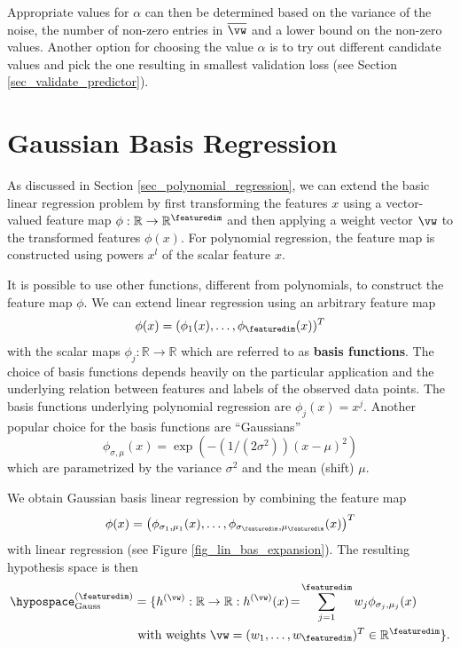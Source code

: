 \documentclass[12pt]{report}
\begin{document}
Appropriate values for $\alpha$ can then be determined based 
on the variance of the noise, the number of non-zero entries in 
$\overline{\vw}$ and a lower bound on the non-zero values. 
Another option for choosing the value $\alpha$ is to try out different 
candidate values and pick the one resulting in smallest validation 
loss (see Section \ref{sec_validate_predictor}). 


\section{Gaussian Basis Regression}
\label{sec_linbasreg}
As discussed in Section \ref{sec_polynomial_regression}, we can 
extend the basic linear regression problem by first transforming 
the features $x$ using a vector-valued feature map $\phi: \mathbb{R} \rightarrow \mathbb{R}^{\featuredim}$ 
and then applying a weight vector $\vw$ to the transformed 
features $\phi(x)$. For polynomial regression, the feature map 
is constructed using powers $x^{l}$ of the scalar feature $x$. 

It is possible to use other functions, different from polynomials, 
to construct the feature map $\phi$. We can extend linear regression 
using an arbitrary feature map 
\begin{equation} 
\phi(x) = (\phi_{1}(x),\ldots,\phi_{\featuredim}(x))^{T}  
\end{equation} 
with the scalar maps $\phi_{j}: \mathbb{R} \rightarrow \mathbb{R}$ which 
are referred to as {\bf basis functions}. The choice of basis functions 
depends heavily on the particular application and the underlying relation 
between features and labels of the observed data points. The basis 
functions underlying polynomial regression are $\phi_{j}(x)= x^{j}$. Another 
popular choice for the basis functions are ``Gaussians'' 
\begin{equation} 
\label{equ_basis_Gaussian}
\phi_{\sigma,\mu}(x) = \exp(-(1/(2\sigma^{2})) (x\!-\!\mu)^{2}) 
\end{equation}
which are parametrized by the variance $\sigma^{2}$ and the mean (shift) $\mu$. 

We obtain Gaussian basis linear regression by combining the feature map 
\begin{equation} 
\phi(x) = \big (\phi_{\sigma_{1},\mu_{1}}(x) ,\ldots,\phi_{\sigma_{\featuredim},\mu_{\featuredim}}(x) \big)^{T} 
\end{equation}
with linear regression (see Figure \ref{fig_lin_bas_expansion}). The resulting hypothesis space is then
\begin{align}
\label{equ_def_Gauss_hypospace}
\hypospace^{(\featuredim)}_{\rm Gauss} & = \{ h^{(\vw)}: \mathbb{R} \rightarrow \mathbb{R}: h^{(\vw)}(x)\!=\!\sum_{j=1}^{\featuredim}  w_{j}\phi_{\sigma_{j},\mu_{j}}(x) \nonumber \\
& \mbox{ with weights } \vw=(w_{1},\ldots,w_{\featuredim})^{T} \in \mathbb{R}^{\featuredim}\}.
\end{align}
\end{document}
